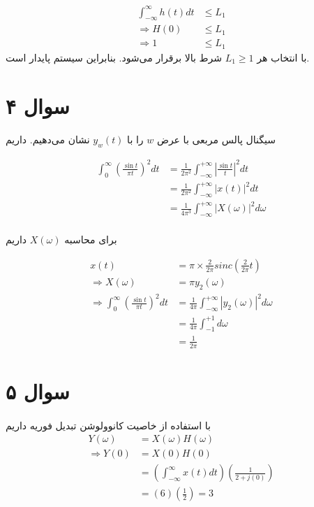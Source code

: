 \documentclass{article}
\begin{document}
	\begin{align*}
		\int_{-\infty}^{\infty} h(t) dt &\le L_1 \\
		\Rightarrow
		H(0) &\le L_1 \\
		\Rightarrow
		1 &\le L_1
	\end{align*}
	با انتخاب هر
	$L_1 \ge 1$
	شرط بالا برقرار می‌شود. بنابراین سیستم پایدار است.

	\section*{سوال ۴}
	\paragraph*{}
	سیگنال پالس مربعی با عرض $w$ را با
	$y_w(t)$
	نشان می‌دهیم. داریم

	\begin{align*}
		\int_{0}^{\infty} \left(\frac{\sin t}{\pi t}\right)^2 dt
		&= \frac{1}{2 \pi^2} \int_{-\infty}^{+\infty} \left|\frac{\sin t}{t}\right| ^ 2 dt \\
		&= \frac{1}{2 \pi^2} \int_{-\infty}^{+\infty} \left|x(t)\right| ^ 2 dt \\
		&= \frac{1}{4 \pi^3} \int_{-\infty}^{+\infty} \left|X(\omega)\right| ^ 2 d\omega \\
	\end{align*}

	برای محاسبه
	$X(\omega)$
	داریم

	\begin{align*}
		x(t) &= \pi \times \frac{2}{2\pi} sinc(\frac{2}{2\pi}t) \\
		\Rightarrow
		X(\omega) &= \pi y_2(\omega) \\
		\Rightarrow
		\int_{0}^{\infty} \left(\frac{\sin t}{\pi t}\right)^2 dt
		&= \frac{1}{4 \pi} \int_{-\infty}^{+\infty} \left|y_2(\omega)\right| ^ 2 d\omega \\
		&= \frac{1}{4 \pi} \int_{-1}^{+1} d\omega \\
		&= \frac{1}{2 \pi}
	\end{align*}

	\section*{سوال ۵}
	\paragraph*{}
	با استفاده از خاصیت کانوولوشن تبدیل فوریه داریم
	\begin{align*}
		Y(\omega) &= X(\omega)H(\omega) \\
		\Rightarrow
		Y(0) &= X(0)H(0) \\
		&= \left(\int_{-\infty}^{\infty} x(t) dt\right)\left(\frac{1}{2+j(0)}\right) \\
		&= \left(6\right)\left(\frac{1}{2}\right) = 3
	\end{align*}
\end{document}
